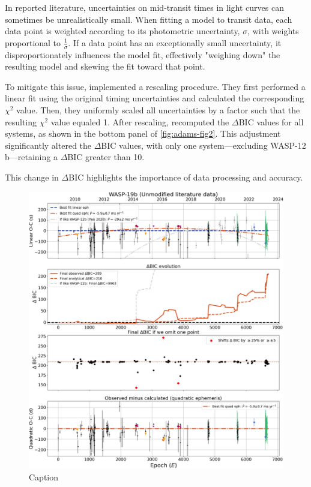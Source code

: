 \documentclass[oneside,12pt]{amsart}
\numberwithin{page}{section}
\begin{document}
In reported literature, uncertainties on mid-transit times in light curves can sometimes be unrealistically small. When fitting a model to transit data, each data point is weighted according to its photometric uncertainty, $\sigma$, with weights proportional to $\frac{1}{\sigma}$. If a data point has an exceptionally small uncertainty, it disproportionately influences the model fit, effectively "weighing down" the resulting model and skewing the fit toward that point.

To mitigate this issue, \citet{adams2024doomed} implemented a rescaling procedure. They first performed a linear fit using the original timing uncertainties and calculated the corresponding $\chi^2$ value. Then, they uniformly scaled all uncertainties by a factor such that the resulting $\chi^2$ value equaled 1. After rescaling, \citep{adams2024doomed} recomputed the $\Delta$BIC values for all systems, as shown in the bottom panel of \ref{fig:adams-fig2}. This adjustment significantly altered the $\Delta$BIC values, with only one system—excluding WASP-12 b—retaining a $\Delta$BIC greater than 10.

This change in $\Delta$BIC highlights the importance of data processing and accuracy. 


\begin{figure}[htbp]
    \centering
    \includegraphics[width=\linewidth]{figs/adams_fig4.jpg}
    \caption{Caption}
    \label{fig:adams-fig4}
\end{figure}
\end{document}
